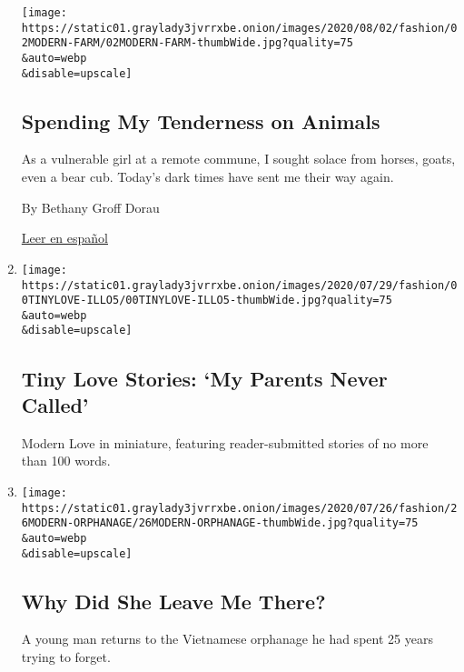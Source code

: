\begin{enumerate}
  \texttt{[image: https://static01.graylady3jvrrxbe.onion/images/2020/08/02/fashion/02MODERN-FARM/02MODERN-FARM-thumbWide.jpg?quality=75\\\&auto=webp\\\&disable=upscale]}

  \hypertarget{spending-my-tenderness-on-animals}{%
  \subsection{Spending My Tenderness on
  Animals}\label{spending-my-tenderness-on-animals}}

  As a vulnerable girl at a remote commune, I sought solace from horses,
  goats, even a bear cub. Today's dark times have sent me their way
  again.

  By Bethany Groff Dorau

  \href{https://www.nytimes3xbfgragh.onion/es/2020/08/09/espanol/estilos-de-vida/amor-animales.html}{Leer
  en español}
\item
  \href{/2020/07/28/style/tiny-modern-love-stories-coronavirus-my-parents-never-called.html}{}

  \texttt{[image: https://static01.graylady3jvrrxbe.onion/images/2020/07/29/fashion/00TINYLOVE-ILLO5/00TINYLOVE-ILLO5-thumbWide.jpg?quality=75\\\&auto=webp\\\&disable=upscale]}

  \hypertarget{tiny-love-stories-my-parents-never-called}{%
  \subsection{Tiny Love Stories: `My Parents Never
  Called'}\label{tiny-love-stories-my-parents-never-called}}

  Modern Love in miniature, featuring reader-submitted stories of no
  more than 100 words.
\item
  \href{/2020/07/24/style/modern-love-adoption-vietnam-why-did-she-leave-me-there.html}{}

  \texttt{[image: https://static01.graylady3jvrrxbe.onion/images/2020/07/26/fashion/26MODERN-ORPHANAGE/26MODERN-ORPHANAGE-thumbWide.jpg?quality=75\\\&auto=webp\\\&disable=upscale]}

  \hypertarget{why-did-she-leave-me-there}{%
  \subsection{Why Did She Leave Me
  There?}\label{why-did-she-leave-me-there}}

  A young man returns to the Vietnamese orphanage he had spent 25 years
  trying to forget.


\end{enumerate}
